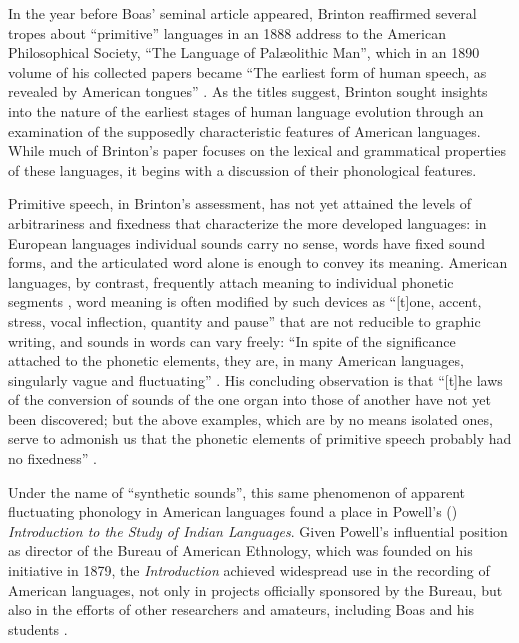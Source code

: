 \documentclass[output=paper]{langscibook}
\begin{document}
In the year before Boas' seminal article appeared, Brinton reaffirmed several tropes about ``primitive'' languages in an 1888 address to the American Philosophical Society, ``The Language of Palæolithic Man'', which in an 1890 volume of his collected papers became ``The earliest form of human speech, as revealed by American tongues'' \citep{Brinton18901888}. As the titles suggest, Brinton sought insights into the nature of the earliest stages of human language evolution through an examination of the supposedly characteristic features of American languages. While much of Brinton's paper focuses on the lexical and grammatical properties of these languages, it begins with a discussion of their phonological features.

Primitive speech, in Brinton's assessment, has not yet attained the levels of arbitrariness and fixedness that characterize the more developed languages: in European languages individual sounds carry no sense, words have fixed sound forms, and the articulated word alone is enough to convey its meaning. American languages, by contrast, frequently attach meaning to individual phonetic segments \citep[394]{Brinton18901888}, word meaning is often modified by such devices as ``[t]one, accent, stress, vocal inflection, quantity and pause'' \citep[399]{Brinton18901888} that are not reducible to graphic writing, and sounds in words can vary freely: ``In spite of the significance attached to the phonetic elements, they are, in many American languages, singularly vague and fluctuating'' \citep[397]{Brinton18901888}. His concluding observation is that ``[t]he laws of the conversion of sounds of the one organ into those of another have not yet been discovered; but the above examples, which are by no means isolated ones, serve to admonish us that the phonetic elements of primitive speech probably had no fixedness'' \citep[398--399]{Brinton18901888}.

Under the name of ``synthetic sounds'', this same phenomenon of apparent fluctuating phonology in American languages found a place in Powell's (\citeyear{Powell18801877}) \emph{Introduction to the Study of Indian Languages}. Given Powell's influential position as director of the Bureau of American Ethnology, which was founded on his initiative in 1879, the \emph{Introduction} achieved widespread use in the recording of American languages, not only in projects officially sponsored by the Bureau, but also in the efforts of other researchers and amateurs, including Boas and his students \citep[see][50--51]{Darnell1998}.
\end{document}
